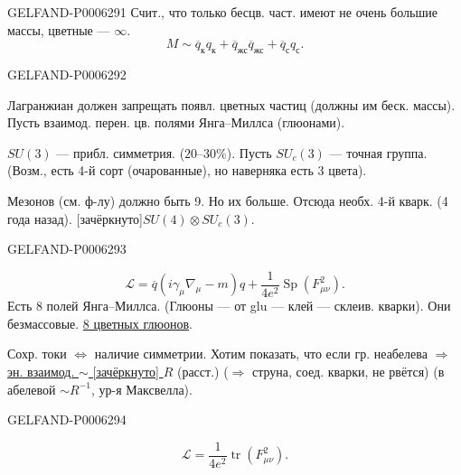 \begin{GelfandAdjacentEvidence}{GELFAND-P000629}{1}
Счит., что только бесцв. част. имеют не очень большие массы, цветные --- \(\infty\).
\[
M\sim\overline q_{\text{к}}q_{\text{к}}+
\overline q_{\text{жс}}\overline q_{\text{жс}}+
\overline q_{\text{с}}q_{\text{с}}.
\]
\end{GelfandAdjacentEvidence}
\begin{GelfandAdjacentEvidence}{GELFAND-P000629}{2}

Лагранжиан должен запрещать появл. цветных частиц (должны им беск. массы).
Пусть взаимод. перен. цв. полями Янга--Миллса (глюонами).

\(SU(3)\) --- прибл. симметрия. (\(20\)--\(30\%\)).
Пусть \(SU_c(3)\) --- точная группа.
(Возм., есть 4-й сорт (очарованные), но наверняка есть 3 цвета).

Мезонов (см. ф-лу) должно быть 9. Но их больше. Отсюда необх. 4-й кварк.
(4 года назад). [зачёркнуто]\qquad \(SU(4)\otimes SU_c(3)\).
\end{GelfandAdjacentEvidence}
\begin{GelfandAdjacentEvidence}{GELFAND-P000629}{3}

\[
\mathcal L=\overline q(i\gamma_\mu\nabla_\mu-m)q+
\frac{1}{4e^2}\operatorname{Sp}(F_{\mu\nu}^2).
\]
Есть 8 полей Янга--Миллса. (Глюоны --- от glu --- клей --- склеив. кварки).
Они безмассовые. \underline{8 цветных глюонов}.

Сохр. токи \(\Longleftrightarrow\) наличие симметрии.
Хотим показать, что если гр. неабелева \(\Rightarrow\)
\underline{эн. взаимод. \(\sim\) [зачёркнуто] \(R\)} (расст.)
(\(\Rightarrow\) струна, соед. кварки, не рвётся)
(в абелевой \(\sim R^{-1}\), ур-я Максвелла).
\end{GelfandAdjacentEvidence}
\begin{GelfandAdjacentEvidence}{GELFAND-P000629}{4}

\[
\mathcal L=\frac{1}{4e^2}\operatorname{tr}(F_{\mu\nu}^2).
\]
\end{GelfandAdjacentEvidence}
